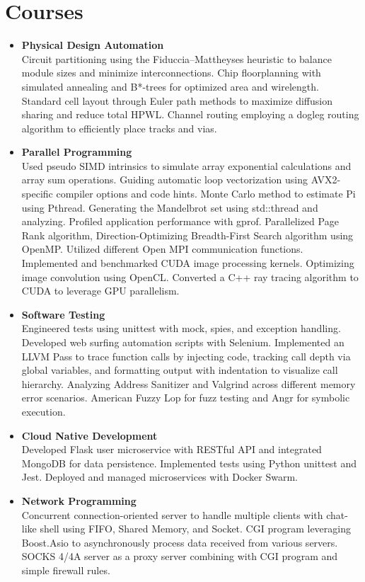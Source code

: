 \documentclass[letterpaper,11pt]{article}
\newcommand{\resumeItem}[2]{
  \item\small{
    \textbf{#1}{\\ #2 \vspace{-4pt}}
  }
}
\newcommand{\resumeSubItem}[2]{\resumeItem{#1}{#2}\vspace{-4pt}}
\newcommand{\resumeSubHeadingListStart}{\begin{itemize}[leftmargin=*]}
\newcommand{\resumeSubHeadingListEnd}{\end{itemize}}
\begin{document}
\section{Courses}
  \resumeSubHeadingListStart
    \resumeSubItem{Physical Design Automation}
      {Circuit partitioning using the Fiduccia–Mattheyses heuristic to balance module sizes and minimize interconnections. 
        Chip floorplanning with simulated annealing and B*-trees for optimized area and wirelength.
        Standard cell layout through Euler path methods to maximize diffusion sharing and reduce total HPWL.
        Channel routing employing a dogleg routing algorithm to efficiently place tracks and vias.}
    \resumeSubItem{Parallel Programming}
      {Used pseudo SIMD intrinsics to simulate array exponential calculations and array sum operations.
      Guiding automatic loop vectorization using AVX2-specific compiler options and code hints. 
      Monte Carlo method to estimate Pi using Pthread. 
      Generating the Mandelbrot set using std::thread and analyzing.
      Profiled application performance with gprof.
      Parallelized Page Rank algorithm, Direction-Optimizing Breadth-First Search algorithm using OpenMP.
      Utilized different Open MPI communication functions.
      Implemented and benchmarked CUDA image processing kernels.
      Optimizing image convolution using OpenCL.
      Converted a C++ ray tracing algorithm to CUDA to leverage GPU parallelism.
      }
    \resumeSubItem{Software Testing}
      {Engineered tests using unittest with mock, spies, and exception handling.
      Developed web surfing automation scripts with Selenium.
      Implemented an LLVM Pass to trace function calls by injecting code, tracking call depth via global variables, and formatting output with indentation to visualize call hierarchy.
      Analyzing Address Sanitizer and Valgrind across different memory error scenarios.
      American Fuzzy Lop for fuzz testing and Angr for symbolic execution.}
    \resumeSubItem{Cloud Native Development}
      {Developed Flask user microservice with RESTful API and integrated MongoDB for data persistence.
      Implemented tests using Python unittest and Jest. Deployed and managed microservices with Docker Swarm.}
      \resumeSubItem{Network Programming}
      {Concurrent connection-oriented server to handle multiple clients with chat-like shell using FIFO, Shared Memory, and Socket.
       CGI program leveraging Boost.Asio to asynchronously process data received from various servers.
       SOCKS 4/4A server as a proxy server combining with CGI program and simple firewall rules.}
  \resumeSubHeadingListEnd
\end{document}
